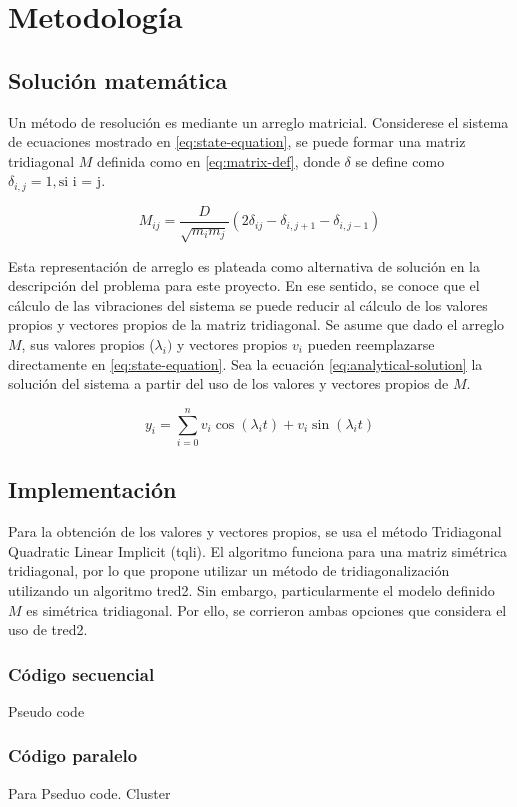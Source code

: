 \section{Metodología}
\subsection{Solución matemática}

Un método de resolución es mediante un arreglo matricial. Considerese el sistema de ecuaciones mostrado en \ref{eq:state-equation}, se puede formar una matriz tridiagonal $M$ definida como en \ref{eq:matrix-def}, donde $\delta$ se define como $\delta_{i,j} = 1, \text{si i = j}$.

\begin{equation}
	M_{ij} = \frac{D}{\sqrt{m_i m_j}} (2 \delta_{ij} - \delta_{i, j+1} - \delta_{i, j-1}) 
	\label{eq:matrix-def}
\end{equation}

Esta representación de arreglo es plateada como alternativa de solución en la descripción del problema para este proyecto. En ese sentido, se conoce que el cálculo de las vibraciones del sistema se puede reducir al cálculo de los valores propios y vectores propios de la matriz tridiagonal. Se asume que dado el arreglo $M$, sus valores propios ($\lambda_i)$ y vectores propios $v_i$ pueden reemplazarse directamente en \ref{eq:state-equation}. Sea la ecuación \ref{eq:analytical-solution} la solución del sistema a partir del uso de los valores y vectores propios de $M$.

\begin{equation}
	y_{i} = \sum^{n}_{i=0} v_i \cos(\lambda_i t ) + v_i \sin(\lambda_i t )  
	\label{eq:analytical-solution}
\end{equation}

\subsection{Implementación}
Para la obtención de los valores y vectores propios, se usa el método Tridiagonal Quadratic Linear Implicit (tqli). El algoritmo funciona para una matriz simétrica tridiagonal, por lo que propone utilizar un método de tridiagonalización utilizando un algoritmo tred2. Sin embargo, particularmente el modelo definido $M$ es simétrica tridiagonal. Por ello, se corrieron ambas opciones que considera el uso de tred2. 

\subsubsection{Código secuencial}
Pseudo code 

\subsubsection{Código paralelo}
Para
Pseduo code. Cluster